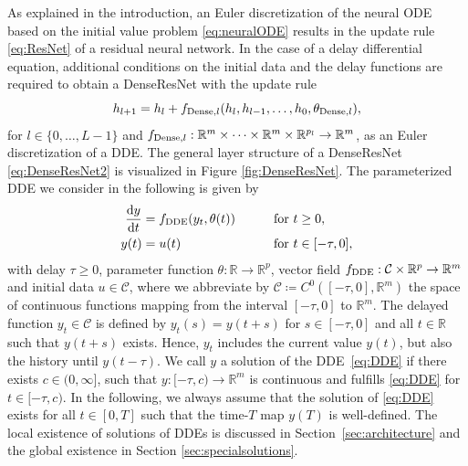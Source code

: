 \documentclass[10pt]{article}
\numberwithin{equation}{section}
\newcommand*{\dd}{\mathrm{d}}
\begin{document}
	As explained in the introduction, an Euler discretization of the neural ODE based on the initial value problem \eqref{eq:neuralODE} results in the update rule \eqref{eq:ResNet} of a residual neural network. In the case of a delay differential equation, additional conditions on the initial data and the delay functions are required to obtain a DenseResNet with the update rule
	\begin{equation}\label{eq:DenseResNet2}
		h_{l+1} = h_{l} + f_{\textup{Dense},l}(h_{l}, h_{l-1}, \ldots, h_0, \theta_{\textup{Dense},l}), 
	\end{equation}
	for $l \in \{0,\ldots,L-1\}$ and  $f_{\textup{Dense},l}: \mathbb{R}^{m} \times \cdots \times \mathbb{R}^m \times \mathbb{R}^{p_l} \rightarrow \mathbb{R}^m$, as an Euler discretization of a DDE. The general layer structure of a DenseResNet \eqref{eq:DenseResNet2} is visualized in Figure \ref{fig:DenseResNet}. The parameterized DDE we consider in the following is given by
	\begin{equation} \label{eq:DDE}
		\begin{aligned}
			\frac{\dd y}{\dd t} &= f_\textup{DDE}(y_t,\theta(t)) \qquad &&\text{for } t\geq 0, \\  
			y(t) &= u(t) &&\text{for } t \in [-\tau,0],
		\end{aligned}
	\end{equation} 
	with delay $\tau \geq 0$, parameter function $\theta:\mathbb{R}\rightarrow \mathbb{R}^{p}$, vector field $f_\textup{DDE}: \mathcal{C} \times \mathbb{R}^{p}\rightarrow \mathbb{R}^m$ and initial data $u \in \mathcal{C}$, where we abbreviate by $\mathcal{C}\coloneqq C^0([-\tau,0],\mathbb{R}^m)$ the space of continuous functions mapping from the interval $[-\tau,0]$ to $\mathbb{R}^m$. The delayed function $y_t \in \mathcal{C}$ is defined by $y_t(s) = y(t+s)$ for $s\in [-\tau,0]$ and all $t\in \mathbb{R}$ such that $y(t+s)$ exists. Hence, $y_t$ includes the current value $y(t)$, but also the history until $y(t-\tau)$. We call $y$ a solution of the DDE~\eqref{eq:DDE} if there exists $c\in(0,\infty]$, such that $y:[-\tau,c)\rightarrow \mathbb{R}^m$ is continuous and fulfills \eqref{eq:DDE} for $t\in[-\tau,c)$.  In the following, we always assume that the solution of \eqref{eq:DDE} exists for all $t\in [0,T]$ such that the time-$T$ map $y(T)$ is well-defined. The local existence of solutions of DDEs is discussed in Section~\ref{sec:architecture} and the global existence in Section \ref{sec:specialsolutions}. 
	
\end{document}
